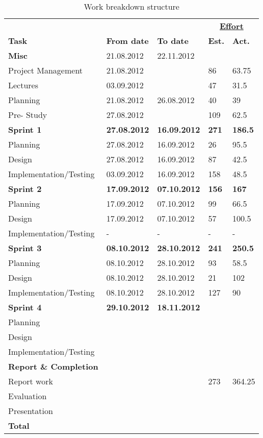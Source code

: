 

\begin{table}


\begin{tabular}{ l|l|l|l|l } \hline
&	 &	 &\multicolumn{2}{c}{\underline{\textbf{Effort}}}	 \\
\textbf{Task}	 & \textbf{From date}	 & \textbf{To date}	 & \textbf{Est.} & \textbf{Act.}	 \\ \hline \hline
\textbf{Misc} & 21.08.2012 & 22.11.2012 & & \\ \hline
Project Management & 21.08.2012 & & 86 & 63.75 \\
Lectures & 03.09.2012 & & 47 & 31.5\\
Planning & 21.08.2012 & 26.08.2012 & 40 & 39 \\
Pre- Study &27.08.2012  & & 109 & 62.5\\ \hline
\bf{Sprint 1}	&\bf{27.08.2012} & \bf{16.09.2012} & \bf{271} & \textbf{186.5} \\ \hline
Planning & 27.08.2012 & 16.09.2012 & 26 & 95.5 \\
Design & 27.08.2012 & 16.09.2012 & 87 & 42.5\\
Implementation/Testing & 03.09.2012 & 16.09.2012 & 158 & 48.5\\ \hline
\bf{Sprint 2} & \bf{17.09.2012} & \bf{07.10.2012} & \bf{156} & \textbf{167} \\ \hline
Planning & 17.09.2012 & 07.10.2012 & 99 & 66.5\\
Design& 17.09.2012 & 07.10.2012 & 57 & 100.5\\
Implementation/Testing & - & - & - & -\\ \hline
\bf{Sprint 3}	 & \bf{08.10.2012} & \bf{28.10.2012} & \bf{241} & \textbf{250.5}\\ \hline
Planning & 08.10.2012 & 28.10.2012 & 93 & 58.5 \\
Design & 08.10.2012 & 28.10.2012 & 21 & 102\\
Implementation/Testing & 08.10.2012 & 28.10.2012 & 127 & 90\\ \hline
\bf{Sprint 4}	& \bf{29.10.2012} & \bf{18.11.2012} & \bf{}  &  \\ \hline
Planning & & &  &	 \\
Design& & & & \\
Implementation/Testing & & &  & \\ \hline
\textbf{Report \& Completion} & & & & \\ \hline
Report work & & & 273 & 364.25\\
Evaluation & & & & \\
Presentation && & & \\ \hline
\bf{Total} & & &\bf{}	& \\ \hline
\end{tabular}
\caption{Work breakdown structure} \label{table:wbs}
\end{table}
